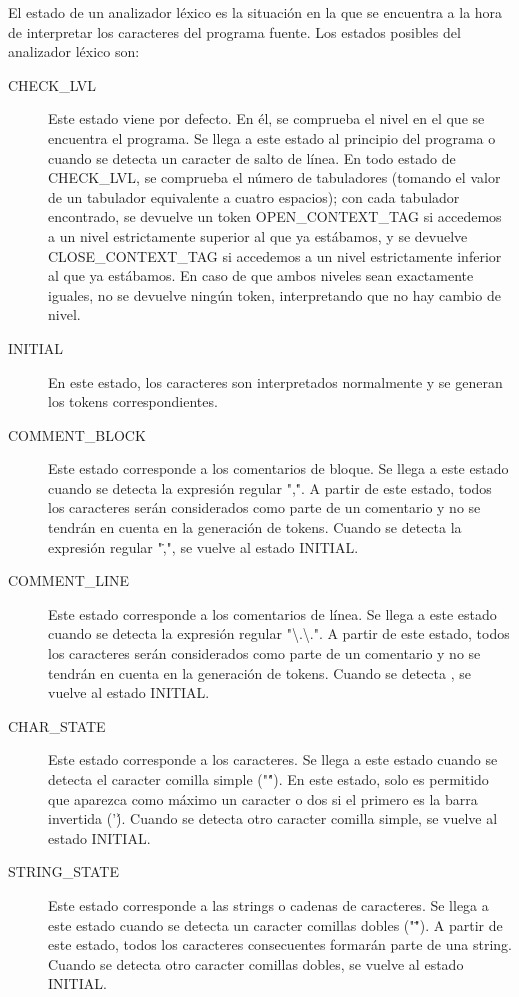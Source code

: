 \documentclass[11pt, english]{article}
\begin{document}
	El estado de un analizador léxico es la situación en la que se encuentra a la hora de interpretar los caracteres del programa fuente. Los estados posibles del analizador léxico son:
	
	\begin{description}
		\item[CHECK\_LVL] Este estado viene por defecto. En él, se comprueba el nivel en el que se encuentra el programa. Se llega a este estado al principio del programa o cuando se detecta un caracter de salto de línea. En todo estado de CHECK\_LVL, se comprueba el número de tabuladores (tomando el valor de un tabulador equivalente a cuatro espacios); con cada tabulador encontrado, se devuelve un token OPEN\_CONTEXT\_TAG si accedemos a un nivel estrictamente superior al que ya estábamos, y se devuelve CLOSE\_CONTEXT\_TAG si accedemos a un nivel estrictamente inferior al que ya estábamos. En caso de que ambos niveles sean exactamente iguales, no se devuelve ningún token, interpretando que no hay cambio de nivel.
		\item[INITIAL] En este estado, los caracteres son interpretados normalmente y se generan los tokens correspondientes.
		\item[COMMENT\_BLOCK] Este estado corresponde a los comentarios de bloque. Se llega a este estado cuando se detecta la expresión regular ",\.". A partir de este estado, todos los caracteres serán considerados como parte de un comentario y no se tendrán en cuenta en la generación de tokens. Cuando se detecta la expresión regular "\.,", se vuelve al estado INITIAL.
		\item[COMMENT\_LINE] Este estado corresponde a los comentarios de línea. Se llega a este estado cuando se detecta la expresión regular "\textbackslash{}.\textbackslash{}.". A partir de este estado, todos los caracteres serán considerados como parte de un comentario y no se tendrán en cuenta en la generación de tokens. Cuando se detecta , se vuelve al estado INITIAL.
		\item[CHAR\_STATE] Este estado corresponde a los caracteres. Se llega a este estado cuando se detecta el caracter comilla simple ("\'"). En este estado, solo es permitido que aparezca como máximo un caracter o dos si el primero es la barra invertida ('\'). Cuando se detecta otro caracter comilla simple, se vuelve al estado INITIAL.
		\item[STRING\_STATE] Este estado corresponde a las strings o cadenas de caracteres. Se llega a este estado cuando se detecta un caracter comillas dobles ("\""). A partir de este estado, todos los caracteres consecuentes formarán parte de una string. Cuando se detecta otro caracter comillas dobles, se vuelve al estado INITIAL.
	\end{description}
	
\end{document}
